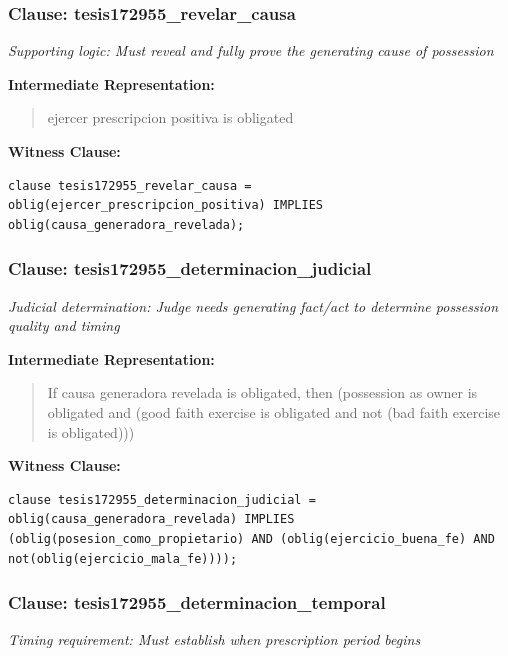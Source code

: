 \documentclass[11pt,a4paper]{article}
\begin{document}
\subsubsection{Clause: tesis172955\_revelar\_causa}

\textit{Supporting logic: Must reveal and fully prove the generating cause of possession}

\textbf{Intermediate Representation:}

\begin{quote}
ejercer prescripcion positiva is obligated
\end{quote}

\textbf{Witness Clause:}

\begin{lstlisting}[style=witnessstyle, language=Witness]
clause tesis172955_revelar_causa = oblig(ejercer_prescripcion_positiva) IMPLIES oblig(causa_generadora_revelada);
\end{lstlisting}

\subsubsection{Clause: tesis172955\_determinacion\_judicial}

\textit{Judicial determination: Judge needs generating fact/act to determine possession quality and timing}

\textbf{Intermediate Representation:}

\begin{quote}
If causa generadora revelada is obligated, then (possession as owner is obligated and (good faith exercise is obligated and not (bad faith exercise is obligated)))
\end{quote}

\textbf{Witness Clause:}

\begin{lstlisting}[style=witnessstyle, language=Witness]
clause tesis172955_determinacion_judicial = oblig(causa_generadora_revelada) IMPLIES (oblig(posesion_como_propietario) AND (oblig(ejercicio_buena_fe) AND not(oblig(ejercicio_mala_fe))));
\end{lstlisting}

\subsubsection{Clause: tesis172955\_determinacion\_temporal}

\textit{Timing requirement: Must establish when prescription period begins}
\end{document}
